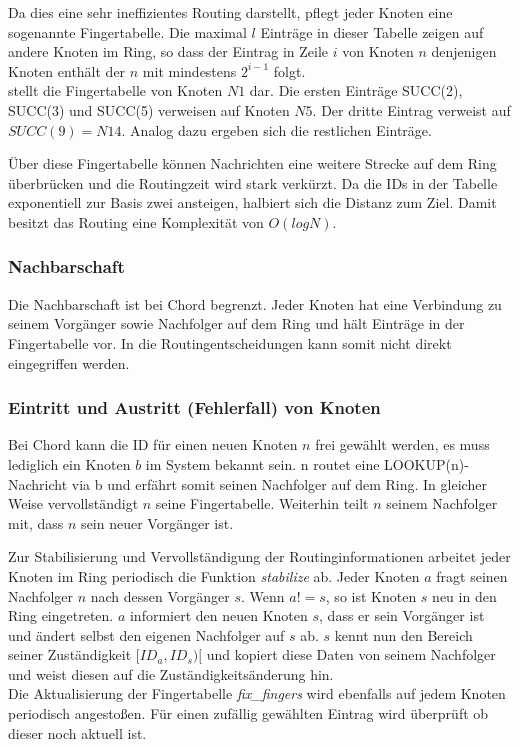 Da dies eine sehr ineffizientes  Routing darstellt, pflegt jeder Knoten eine sogenannte Fingertabelle. Die maximal $l$ Einträge in dieser Tabelle zeigen auf andere Knoten im Ring, so dass der Eintrag in Zeile $i$ von Knoten $n$ denjenigen Knoten enthält der $n$ mit mindestens $2^{i-1}$ folgt.\\
 stellt die Fingertabelle von Knoten $N1$ dar. Die ersten Einträge SUCC(2), SUCC(3) und SUCC(5) verweisen auf Knoten $N5$. Der dritte Eintrag verweist auf $SUCC(9) = N14$. Analog dazu ergeben sich die restlichen Einträge.

Über diese Fingertabelle können Nachrichten eine weitere Strecke auf dem Ring überbrücken und die Routingzeit wird stark verkürzt. Da die IDs in der Tabelle exponentiell zur Basis zwei ansteigen, halbiert sich die Distanz zum Ziel. Damit besitzt das Routing eine Komplexität von $O(log N)$.

\subsubsection*{Nachbarschaft}
Die Nachbarschaft ist bei Chord begrenzt. Jeder Knoten hat eine Verbindung zu seinem Vorgänger sowie Nachfolger auf dem Ring und hält Einträge in der Fingertabelle vor. In die Routingentscheidungen kann somit nicht direkt eingegriffen werden.

\subsubsection*{Eintritt und Austritt (Fehlerfall) von Knoten}
Bei Chord kann die ID für einen neuen Knoten $n$ frei gewählt werden, es muss lediglich ein Knoten $b$ im System bekannt sein. n routet eine LOOKUP(n)-Nachricht via b und erfährt somit seinen Nachfolger auf dem Ring. In gleicher Weise vervollständigt $n$ seine Fingertabelle. Weiterhin teilt $n$ seinem Nachfolger mit, dass $n$ sein neuer Vorgänger ist.

Zur Stabilisierung und Vervollständigung der Routinginformationen arbeitet jeder Knoten im Ring periodisch die Funktion \emph{stabilize} ab. Jeder Knoten $a$ fragt seinen Nachfolger $n$ nach dessen Vorgänger $s$. Wenn $a != s$, so ist Knoten $s$ neu in den Ring eingetreten. $a$ informiert den neuen Knoten $s$, dass er sein Vorgänger ist und ändert selbst den eigenen Nachfolger auf $s$ ab. $s$ kennt nun den Bereich seiner Zuständigkeit $[ID_a, ID_s)[$ und kopiert diese Daten von seinem Nachfolger und weist diesen auf die Zuständigkeitsänderung hin.\\
Die Aktualisierung der Fingertabelle \emph{fix\_fingers} wird ebenfalls auf jedem Knoten periodisch angestoßen. Für einen zufällig gewählten Eintrag wird überprüft ob dieser noch aktuell ist.

